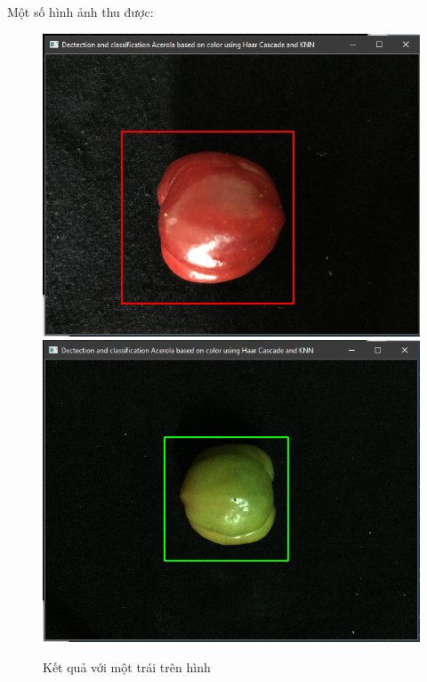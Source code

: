 \documentclass[12pt,a4paper]{article}
\begin{document}
\pagebreak
Một số hình ảnh thu được:
\begin{center}
    \begin{figure}[htp]
    \begin{center}
    \includegraphics[scale=.4]{Images/f1}
    \includegraphics[scale=.4]{Images/f3}
    \end{center}
    \caption{Kết quả với một trái trên hình}
    \end{figure}
\end{center}
\end{document}

